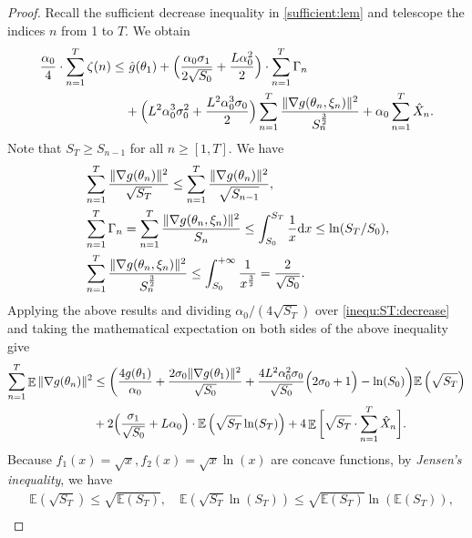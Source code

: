 \documentclass[standalone]{article}
\newcommand{\E}{\mathbb{E}}
\DeclareMathOperator{\Expect}{\mathbb{E}}
\begin{document}
\begin{proof}
Recall the sufficient decrease inequality in \cref{sufficient:lem} and telescope the indices \( n \) from 1 to \( T \). We obtain
\begin{align}\label{inequ:ST:decrease}
\frac{\alpha_{0}}{4}\cdot\sum_{n=1}^{T}\zeta(n) \le&\ \hat{g}(\theta_{1})+\Big(\frac{\alpha_{0}\sigma_{1}}{2\sqrt{S_{0}}}+\frac{ L\alpha_{0}^{2}}{2}\Big)\cdot\sum_{n=1}^{T}\Gamma_n   \notag \\&+\Big( L^{2}\alpha_{0}^{3}\sigma_{0}^{2}+\frac{ L^{2}\alpha_{0}^{3}\sigma_{0}}{2}\Big)\sum_{n=1}^{T}\frac{\|\nabla g(\theta_{n},\xi_{n})\|^{2}}{S_{n}^{\frac{3}{2}}} +\alpha_0\sum_{n=1}^{T}\hat{X}_{n}.
\end{align}
Note that $S_T \geq S_{n-1}$ for all $n \geq [1, T]$. We have
\begin{align}\label{inequ:sum:grad:sn:1}
&\sum_{n=1}^{T}\frac{\|\nabla g(\theta_{n})\|^{2}}{\sqrt{S_{T}}} \leq \sum_{n=1}^{T}\frac{\|\nabla g(\theta_{n})\|^{2}}{\sqrt{S_{n-1}}} ,\notag \\& \sum_{n=1}^{T} \Gamma_n  =  \sum_{n=1}^{T} \frac{\|\nabla g(\theta_{n},\xi_{n})\|^{2}}{S_{n}} \leq \int_{S_{0}}^{S_{T}}\frac{1}{x}\text{d}x \leq \ln (S_T/S_0), \notag \\&\sum_{n=1}^{T}\frac{\|\nabla g(\theta_{n},\xi_{n})\|^{2}}{S^{\frac{3}{2}}_{n}}  \leq \int_{S_{0}}^{+\infty}\frac{1}{x^{\frac{3}{2}}}=\frac{2}{\sqrt{S_{0}}}.
\end{align}
Applying the above results and dividing $\alpha_0/(4\sqrt{S_T})$ over \cref{inequ:ST:decrease} and taking the mathematical expectation on both sides of the above inequality  give
\begin{align}\label{inequ:norm:grad:sum}
\sum_{n=1}^{T}\Expect\|\nabla g(\theta_{n})\|^{2}&\le \bigg(\frac{4g(\theta_{1})}{\alpha_0}+\frac{2\sigma_{0}\|\nabla g(\theta_{1})\|^{2}}{\sqrt{S_{0}}}+\frac{4 L^{2}\alpha_{0}^{2}\sigma_{0}}{\sqrt{S_{0}}}\Big(2\sigma_{0}+1\Big) - \ln(S_0)\bigg)\E\left(\sqrt{S_{T}} \right)\notag \\& +2\Big(\frac{\sigma_{1}}{\sqrt{S_{0}}}+ L\alpha_{0}\Big)\cdot \E\left(\sqrt{S_{T}}\ln (S_{T})\right)+ 4\Expect\bigg[\sqrt{S_{T}}\cdot\sum_{n=1}^{T}\hat{X}_{n}\bigg].
\end{align}
Because $f_1(x)=\sqrt{x}, f_2(x)=\sqrt{x}\ln(x)$ are concave functions, by \emph{Jensen's inequality}, we have 
\begin{align}
&\E\left(\sqrt{S_T} \right) \leq \sqrt{\E\left(S_T \right)}, \quad \E\left(\sqrt{S_T}\ln(S_T) \right) \leq \sqrt{\E\left(S_T \right)} \ln(\E(S_T)),  \label{inequ:ST}\\

\end{align}
\end{proof}
\end{document}
